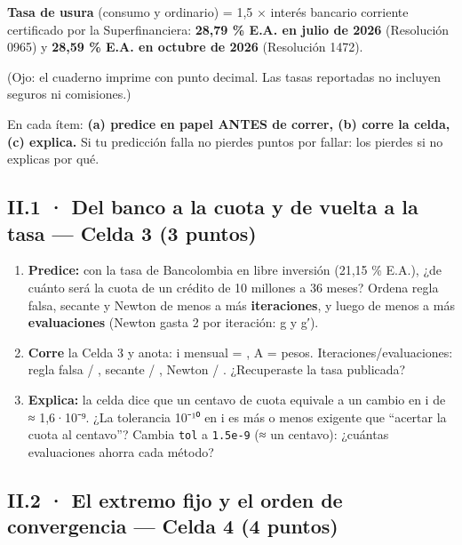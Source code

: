 \textbf{Tasa de usura} (consumo y ordinario) = 1,5 × interés bancario corriente certificado por la Superfinanciera: \textbf{28,79 \% E.A. en julio de 2026} (Resolución 0965) y \textbf{28,59 \% E.A. en octubre de 2026} (Resolución 1472).

(Ojo: el cuaderno imprime con punto decimal. Las tasas reportadas no incluyen seguros ni comisiones.)

En cada ítem: \textbf{(a) predice en papel ANTES de correr, (b) corre la celda, (c) explica.} Si tu predicción falla no pierdes puntos por fallar: los pierdes si no explicas por qué.

\subsection{II.1 · Del banco a la cuota y de vuelta a la tasa --- Celda 3 (3 puntos)}

\begin{enumerate}
\def\labelenumi{\alph{enumi})}
\item
  \textbf{Predice:} con la tasa de Bancolombia en libre inversión (21,15 \% E.A.), ¿de cuánto será la cuota de un crédito de 10 millones a 36 meses? Ordena regla falsa, secante y Newton de menos a más \textbf{iteraciones}, y luego de menos a más \textbf{evaluaciones} (Newton gasta 2 por iteración: g y g′).
\item
  \textbf{Corre} la Celda 3 y anota: i mensual =  , A =  pesos. Iteraciones/evaluaciones: regla falsa  /  , secante  /  , Newton  /  . ¿Recuperaste la tasa publicada?
\item
  \textbf{Explica:} la celda dice que un centavo de cuota equivale a un cambio en i de ≈ 1,6·10⁻⁹. ¿La tolerancia 10⁻¹⁰ en i es más o menos exigente que ``acertar la cuota al centavo''? Cambia \texttt{tol} a \texttt{1.5e-9} (≈ un centavo): ¿cuántas evaluaciones ahorra cada método?
\end{enumerate}

\subsection{II.2 · El extremo fijo y el orden de convergencia --- Celda 4 (4 puntos)}

